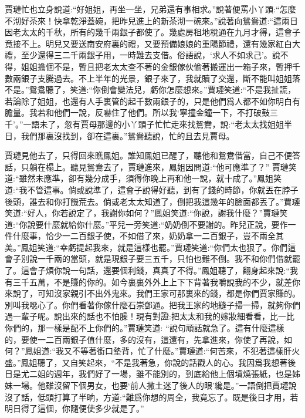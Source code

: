 \begin{parag}
    賈璉忙也立身說道:“好姐姐，再坐一坐，兄弟還有事相求。”說著便罵小丫頭:“怎麼不沏好茶來！快拿乾淨蓋碗，把昨兒進上的新茶沏一碗來。”說著向鴛鴦道:“這兩日因老太太的千秋，所有的幾千兩銀子都使了。幾處房租地稅通在九月才得，這會子竟接不上。明兒又要送南安府裏的禮，又要預備娘娘的重陽節禮，還有幾家紅白大禮，至少還得三二千兩銀子用，一時難去支借。俗語說，‘求人不如求己’。說不得，姐姐擔個不是，暫且把老太太查不著的金銀傢伙偷著搬運出一箱子來，暫押千數兩銀子支騰過去。不上半年的光景，銀子來了，我就贖了交還，斷不能叫姐姐落不是。”鴛鴦聽了，笑道:“你倒會變法兒，虧你怎麼想來。”賈璉笑道:“不是我扯謊，若論除了姐姐，也還有人手裏管的起千數兩銀子的，只是他們爲人都不如你明白有膽量。我若和他們一說，反嚇住了他們。所以我‘寧撞金鐘一下，不打破鼓三千’。”一語未了，忽有賈母那邊的小丫頭子忙忙走來找鴛鴦，說:“老太太找姐姐半日，我們那裏沒找到，卻在這裏。”鴛鴦聽說，忙的且去見賈母。
\end{parag}


\begin{parag}
    賈璉見他去了，只得回來瞧鳳姐。誰知鳳姐已醒了，聽他和鴛鴦借當，自己不便答話，只躺在榻上。聽見鴛鴦去了，賈璉進來，鳳姐因問道:“他可應準了？” 賈璉笑道:“雖然未應準，卻有幾分成手，須得你晚上再和他一說，就十成了。”鳳姐笑道:“我不管這事。倘或說準了，這會子說得好聽，到有了錢的時節，你就丟在脖子後頭，誰去和你打饑荒去。倘或老太太知道了，倒把我這幾年的臉面都丟了。”賈璉笑道:“好人，你若說定了，我謝你如何？”鳳姐笑道:“你說，謝我什麼？”賈璉笑道:“你說要什麼就給你什麼。”平兒一旁笑道:“奶奶倒不要謝的。昨兒正說，要作一件什麼事，恰少一二百銀子使，不如借了來，奶奶拿一二百銀子，豈不兩全其美。”鳳姐笑道:“幸虧提起我來，就是這樣也罷。”賈璉笑道:“你們太也狠了。你們這會子別說一千兩的當頭，就是現銀子要三五千，只怕也難不倒。我不和你們借就罷了。這會子煩你說一句話，還要個利錢，真真了不得。”鳳姐聽了，翻身起來說:“我有三千五萬，不是賺的你的。如今裏裏外外上上下下背著我嚼說我的不少，就差你來說了，可知沒家親引不出外鬼來。我們王家可那裏來的錢，都是你們賈家賺的。別叫我噁心了。你們看著你傢什麼石崇鄧通。把我王家的地縫子掃一掃，就夠你們過一輩子呢。說出來的話也不怕臊！現有對證:把太太和我的嫁妝細看看，比一比你們的，那一樣是配不上你們的。”賈璉笑道: “說句頑話就急了。這有什麼這樣的，要使一二百兩銀子值什麼，多的沒有，這還有，先拿進來，你使了再說，如何？”鳳姐道:“我又不等著銜口墊背，忙了什麼。”賈璉道:“何苦來，不犯著這樣肝火盛。”鳳姐聽了，又自笑起來，“不是我著急，你說的話戳人的心。我因爲我想著後日是尤二姐的週年，我們好了一場，雖不能別的，到底給他上個墳燒張紙，也是姊妹一場。他雖沒留下個男女，也要‘前人撒土迷了後人的眼’纔是。”一語倒把賈璉說沒了話，低頭打算了半晌，方道:“難爲你想的周全，我竟忘了。既是後日才用，若明日得了這個，你隨便使多少就是了。”
\end{parag}


